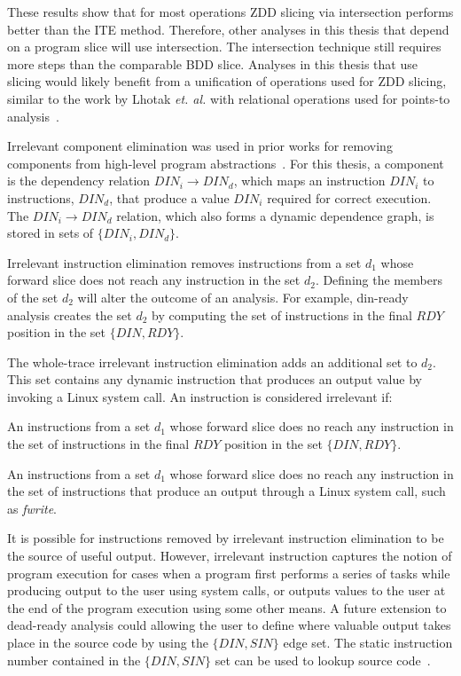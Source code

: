 {These results show that for most operations ZDD slicing via intersection performs better than the ITE method.  Therefore, other analyses in this thesis that depend on a program slice will use intersection.  The intersection technique still requires more steps than the comparable BDD slice.  Analyses in this thesis that use slicing would likely benefit from a unification of operations used for ZDD slicing, similar to the work by Lhotak \textit{et. al.} with relational operations used for points-to analysis~\cite{lhotak:08:lcpc}.


Irrelevant component elimination was used in prior works for removing components from high-level program abstractions~\cite{corbett:icsc:2000}.  For this thesis, a component is the dependency relation $DIN_i \rightarrow DIN_d$, which maps an instruction $DIN_i$ to instructions, $DIN_d$, that produce a value $DIN_i$ required for correct execution.  The $DIN_i \rightarrow DIN_d$ relation, which also forms a dynamic dependence graph, is stored in sets of $\{DIN_i,DIN_d\}$.

Irrelevant instruction elimination removes instructions from a set $d_1$ whose forward slice does not reach any instruction in the set $d_2$.  Defining the members of the set $d_2$ will alter the outcome of an analysis.  For example, din-ready analysis creates the set $d_2$ by computing the set of instructions in the final $RDY$ position in the set $\{DIN,RDY\}$.

The whole-trace irrelevant instruction elimination adds an additional set to $d_2$. This set contains any dynamic instruction that produces an output value by invoking a Linux system call.  An instruction is considered irrelevant if:

\begin{itemize} An instructions from a set $d_1$ whose forward slice does no
 reach any instruction in the set of instructions in the final $RDY$ position in the set $\{DIN,RDY\}$.

 An instructions from a set $d_1$ whose forward slice does no
 reach any instruction in the set of instructions that produce an output through a Linux system call, such as \textit{fwrite}. \end{itemize}

It is possible for instructions removed by irrelevant instruction elimination to be the source of useful output.  However, irrelevant instruction captures the notion of program execution for cases when a program first performs a series of tasks while producing output to the user using system calls, or outputs values to the user at the end of the program execution using some other means. A future extension to dead-ready analysis could allowing the user to define where valuable output takes place in the source code by using the $\{DIN,SIN\}$ edge set.  The static instruction number contained in the $\{DIN,SIN\}$ set can be used to lookup source code~\cite{price:08:pact}.

}

